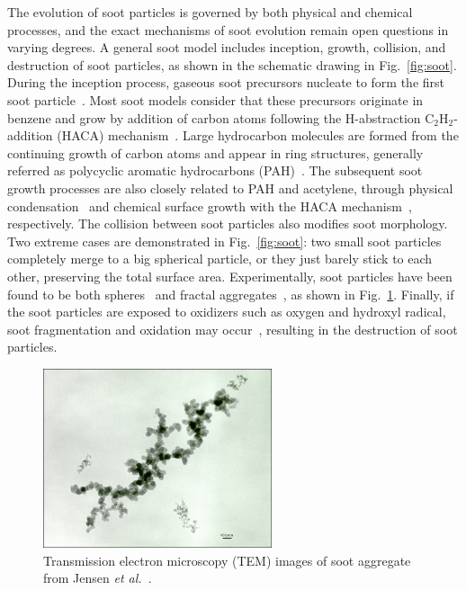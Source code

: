 The evolution of soot particles is governed by both physical and chemical processes, and the exact mechanisms of soot evolution remain open questions in varying degrees.  A general soot model includes inception, growth, collision, and destruction of soot particles, as shown in the schematic drawing in Fig.~\ref{fig:soot}.  During the inception process, gaseous soot precursors nucleate to form the first soot particle~\cite{schuetz02,wong09,blanquart09c}.  Most soot models consider that these precursors originate in benzene and grow by addition of carbon atoms following the H-abstraction C$_2$H$_2$-addition (HACA) mechanism~\cite{frenklach91}.  Large hydrocarbon molecules are formed from the continuing growth of carbon atoms and appear in ring structures, generally referred as polycyclic aromatic hydrocarbons (PAH)~\cite{schuetz02}.  The subsequent soot growth processes are also closely related to PAH and acetylene, through physical condensation~\cite{park03,mitchell98,mitchell03} and chemical surface growth with the HACA mechanism~\cite{frenklach91}, respectively.  The collision between soot particles also modifies soot morphology.  Two extreme cases are demonstrated in Fig.~\ref{fig:soot}: two small soot particles completely merge to a big spherical particle, or they just barely stick to each other, preserving the total surface area.  Experimentally, soot particles have been found to be both spheres~\cite{zhao05} and fractal aggregates~\cite{jensen07}, as shown in Fig.~\ref{fig:TEM}.  Finally, if the soot particles are exposed to oxidizers such as oxygen and hydroxyl radical, soot fragmentation and oxidation may occur~\cite{kazakov95,neoh81}, resulting in the destruction of soot particles.

\begin{figure}[t]
  \centering
  \scriptsize
  \includegraphics[width=0.6\textwidth]{ch-intro/TEM.jpg}
  \normalsize
  \caption{Transmission electron microscopy (TEM) images of soot aggregate from Jensen \emph{et al.}~\cite{jensen07}.}
  \label{fig:TEM}
\end{figure}

